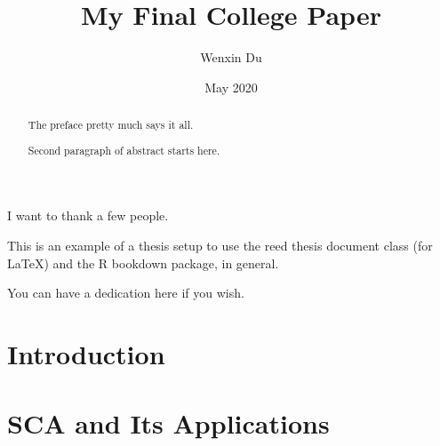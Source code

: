 \documentclass[12pt,twoside]{reedthesis}
\title{My Final College Paper}
\author{Wenxin Du}
\date{May 2020}
\begin{document}
      \maketitle
  
  \frontmatter %
  \pagestyle{empty} %

      \begin{acknowledgements}
      I want to thank a few people.
    \end{acknowledgements}
  
      \begin{preface}
      This is an example of a thesis setup to use the reed thesis document
      class (for LaTeX) and the R bookdown package, in general.
    \end{preface}
  
      \hypersetup{linkcolor=black}
    \setcounter{tocdepth}{2}
    \tableofcontents
  
      \listoftables
  
      \listoffigures
  
      \begin{abstract}
      The preface pretty much says it all. \par  Second paragraph of abstract
      starts here.
    \end{abstract}
  
      \begin{dedication}
      You can have a dedication here if you wish.
    \end{dedication}
  
  \mainmatter %
  \pagestyle{fancyplain} %

  \chapter*{Introduction}\label{introduction}
  
  \chapter{SCA and Its Applications}\label{sca-and-its-applications}
  
  \par 
  
\end{document}
